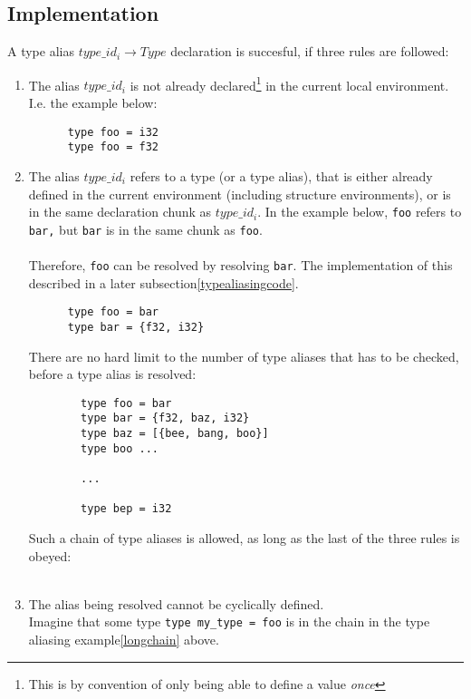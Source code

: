 \subsection{Implementation}\label{typealiasimplementation}
A type alias $type\_id_i \to Type$ declaration is succesful, if three rules are followed:
\begin{enumerate}
  \item The alias $type\_id_i$ is not already declared\footnote{This is by convention of
      only being able to define a value \textit{once}} in the current local
    environment. I.e. the example below:
    \begin{verbatim}
      type foo = i32
      type foo = f32
    \end{verbatim}
\clearpage
  \item The alias $type\_id_i$ refers to a type (or a type alias), that is either already
    defined in the current environment (including structure environments), or is
    in the same declaration chunk as $type\_id_i$. In the example below, \texttt{foo} refers
    to \texttt{bar,} but \texttt{bar} is in the same chunk as \texttt{foo}.\\
    \\
    Therefore, \texttt{foo} can be resolved by resolving \texttt{bar}. The implementation of this
    described in a later subsection\ref{typealiasingcode}.
    \begin{verbatim} 
      type foo = bar
      type bar = {f32, i32}
    \end{verbatim}
    There are no hard limit to the number of type aliases that has to be
    checked, before a type alias is resolved:
    \label{longchain}
      \begin{verbatim}
        type foo = bar
        type bar = {f32, baz, i32}
        type baz = [{bee, bang, boo}]
        type boo ...
  
        ...
  
        type bep = i32
        \end{verbatim}
    Such a chain of type aliases is allowed, as long as the last of the three
    rules is obeyed:
    \\
    \\
  \item The alias being resolved cannot be cyclically defined.\label{cyclicaldefinitionerror}\\
    Imagine that some type \texttt{type my\_type = foo} is in the chain in the
    type aliasing example\ref{longchain} above.\\


\end{enumerate}
